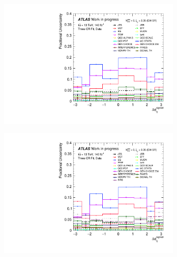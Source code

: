\begin{figure}[t]
\begin{subfigure}[b]{0.48\textwidth}
    \includegraphics[width=\textwidth]{plots/diffx/final/data/3cr/Systematic_Uncertainties_data_lepgam_dphi_3cr_QCD_Sh2211_0p01sigma.pdf}
    \caption{}
\end{subfigure}
\hfill
\begin{subfigure}[b]{0.48\textwidth}
    \centering
    \includegraphics[width=\textwidth]{plots/diffx/final/unfolded/3cr/Systematic_Uncertainties_data_unfolded_lepgam_dphi_3cr_QCD_Sh2211_0p01sigma.pdf}
    \caption{}
\end{subfigure}
\begin{subfigure}[b]{0.48\textwidth}
    \centering

\end{subfigure}
\end{figure}
